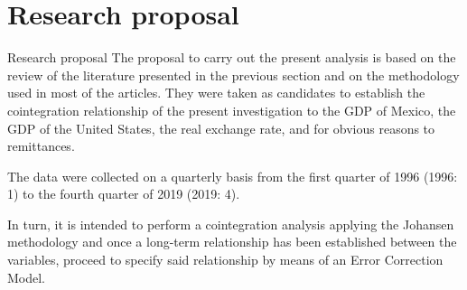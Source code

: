 \section{Research proposal}
    \begin{frame}{Research proposal}
The proposal to carry out the present analysis is based on the review of the literature presented in the previous section and on the methodology used in most of the articles. They were taken as candidates to establish the cointegration relationship of the present investigation to the GDP of Mexico, the GDP of the United States, the real exchange rate, and for obvious reasons to remittances. \par
The data were collected on a quarterly basis from the first quarter of 1996 (1996: 1) to the fourth quarter of 2019 (2019: 4).\par	
In turn, it is intended to perform a cointegration analysis applying the Johansen methodology and once a long-term relationship has been established between the variables, proceed to specify said relationship by means of an Error Correction Model.\par
\end{frame}
